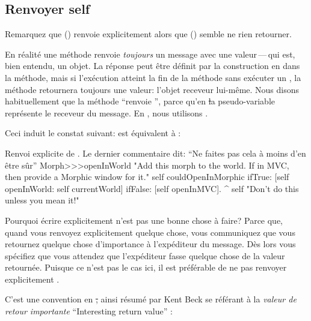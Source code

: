 \documentclass[a4paper,10pt,twoside]{book}
\begin{document}
\subsection{Renvoyer self}

Remarquez que  () renvoie explicitement  alors que  () semble ne rien retourner.

En r\'ealit\'e une m\'ethode renvoie \emph{toujours} un message avec une valeur\,---\,qui est, bien entendu, un objet.
La r\'eponse peut \^etre d\'efinit par la construction en \ct{^} dans la m\'ethode, mais si l'ex\'ecution atteint la fin de la m\'ethode sans ex\'ecuter un \ct{^}, la m\'ethode retournera toujours une valeur: l'objet receveur lui-m\^eme.
Nous disons habituellement que la m\'ethode ``renvoie \self'', parce qu'en
\st la pseudo-variable \self repr\'esente le receveur du message. En , nous utilisons .

Ceci induit le constat suivant:  est \'equivalent \`a \mbox{:}

\begin{method}[openInWorldReturnSelf]{Renvoi explicite de \mbox{\self.} Le dernier commentaire dit: ``Ne faites pas cela \`a moins d'en \^etre s\^ur''}
Morph>>>openInWorld
	"Add this morph to the world.  If in MVC,
	then provide a Morphic window for it."
	self couldOpenInMorphic
		ifTrue: [self openInWorld: self currentWorld]
		ifFalse: [self openInMVC].
	^ self		"Don't do this unless you mean it!"
\end{method}

Pourquoi \'ecrire  explicitement n'est pas une bonne chose \`a faire?
Parce que, quand vous renvoyez explicitement quelque chose, vous communiquez
que vous retournez quelque chose d'importance \`a l'exp\'editeur du message.
D\`es lors vous sp\'ecifiez que vous attendez que l'exp\'editeur fasse quelque chose de la valeur retourn\'ee.
Puisque ce n'est pas le cas ici, il est pr\'ef\'erable de ne pas renvoyer explicitement \self.

C'est une convention en \st, ainsi r\'esum\'e par Kent Beck se r\'ef\'erant \`a la \emph{valeur de retour importante} ``Interesting return value'' \cite{Beck97a}:
\end{document}
